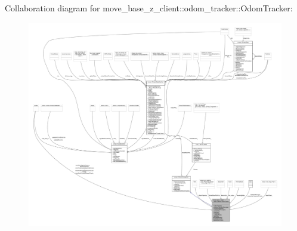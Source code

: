 Collaboration diagram for move\+\_\+base\+\_\+z\+\_\+client\+:\+:odom\+\_\+tracker\+:\+:Odom\+Tracker\+:\nopagebreak
\begin{figure}[H]
\begin{center}
\leavevmode
\includegraphics[width=350pt]{classmove__base__z__client_1_1odom__tracker_1_1OdomTracker__coll__graph}
\end{center}
\end{figure}
